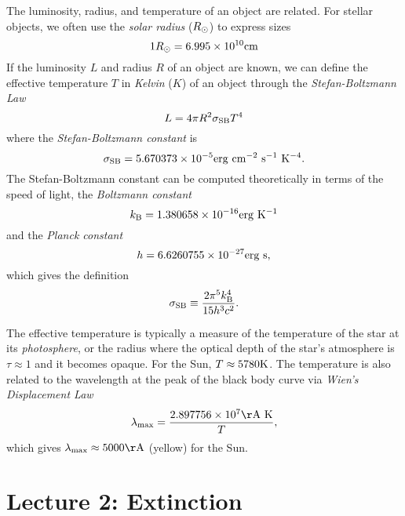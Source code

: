 \documentclass[]{article}
\begin{document}
The luminosity, radius, and temperature of an object are related. For stellar
objects, we often use the {\it solar radius} ($R_{\odot}$) to express sizes
\begin{equation}
1R_{\odot} = 6.995 \times 10^{10} \mathrm{cm}
\end{equation}
\noindent
If the luminosity $L$ and radius $R$ of an object are known, we can define
the effective temperature $T$ in {\it Kelvin} ($K$)
of an object through the {\it Stefan-Boltzmann Law}
\begin{equation}
L = 4\pi R^{2}\sigma_{\mathrm{SB}} T^{4}
\end{equation}
\noindent
where the {\it Stefan-Boltzmann constant} is
\begin{equation}
\sigma_{\mathrm{SB}} = 5.670373\times10^{-5} \mathrm{erg}~\mathrm{cm}^{-2}~\mathrm{s}^{-1}~\mathrm{K}^{-4}.
\end{equation}
The Stefan-Boltzmann constant can be computed theoretically in
terms of the speed of light, the {\it Boltzmann constant}
\begin{equation}
k_{\mathrm{B}} = 1.380658\times10^{-16} \mathrm{erg}~\mathrm{K}^{-1}
\end{equation}
\noindent
and the {\it Planck constant}
\begin{equation}
h = 6.6260755\times10^{-27}\mathrm{erg}~\mathrm{s},
\end{equation}
\noindent
which gives the definition
\begin{equation}
\sigma_{\mathrm{SB}} \equiv \frac{2\pi^5 k_{\mathrm{B}}^4}{15 h^3 c^2}.
\end{equation}

The effective temperature is typically a measure of the temperature
of the star at its {\it photosphere}, or the radius where the optical
depth of the star's atmosphere is $\tau\approx1$ and it becomes opaque. 
For the Sun,
$T\approx5780\mathrm{K}$. The temperature is also related to the wavelength
at the peak of the black body curve via {\it Wien's Displacement Law}
\begin{equation}
\lambda_{\mathrm{max}} = \frac{2.897756\times10^{7} \Ang~\K}{T},
\end{equation}
which gives $\lambda_{\mathrm{max}}\approx5000\Ang$ (yellow)
for the Sun.


\section{Lecture 2: Extinction}
\end{document}
